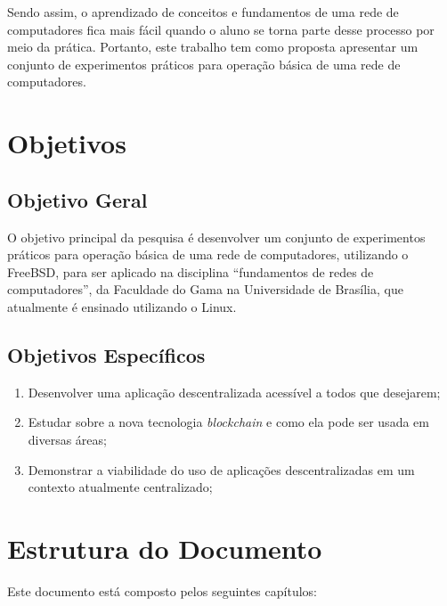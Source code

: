 Sendo assim, o aprendizado de conceitos e fundamentos de uma rede de computadores fica mais fácil quando o aluno se torna parte desse processo por meio da prática. Portanto, este trabalho tem como proposta apresentar um conjunto de experimentos práticos para operação básica de uma rede de computadores.


\section{Objetivos}

    \subsection{Objetivo Geral}
    
    O objetivo principal da pesquisa é desenvolver um conjunto de experimentos práticos para operação básica de uma rede de computadores, utilizando o FreeBSD, para ser aplicado na disciplina “fundamentos de redes de computadores”, da Faculdade do Gama na Universidade de Brasília, que atualmente é ensinado utilizando o Linux.
    
    \subsection{Objetivos Específicos}
    
    \begin{enumerate}
        \item Desenvolver uma aplicação descentralizada acessível a todos que desejarem;
        \item Estudar sobre a nova tecnologia \textit{blockchain} e como ela pode ser usada em diversas áreas;
        \item Demonstrar a viabilidade do uso de aplicações descentralizadas em um contexto atualmente centralizado;
    \end{enumerate}
    
    
\section{Estrutura do Documento}

Este documento está composto pelos seguintes capítulos:

